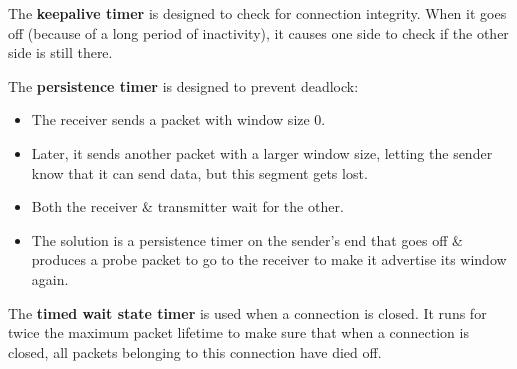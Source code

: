 \documentclass[11pt]{article}
\begin{document}
The \textbf{keepalive timer} is designed to check for connection integrity.
When it goes off (because of a long period of inactivity), it causes one side to check if the other side is still there.

The \textbf{persistence timer} is designed to prevent deadlock:
\begin{itemize}
    \item   The receiver sends a packet with window size 0. 
    \item   Later, it sends another packet with a larger window size, letting the sender know that it can send data, but this segment gets lost.
    \item   Both the receiver \& transmitter wait for the other.
    \item   The solution is a persistence timer on the sender's end that goes off \& produces a probe packet to go to the receiver to make it advertise its window again.
\end{itemize}

The \textbf{timed wait state timer} is used when a connection is closed. 
It runs for twice the maximum packet lifetime to make sure that when a connection is closed, all packets belonging to this connection have died off.
\end{document}
